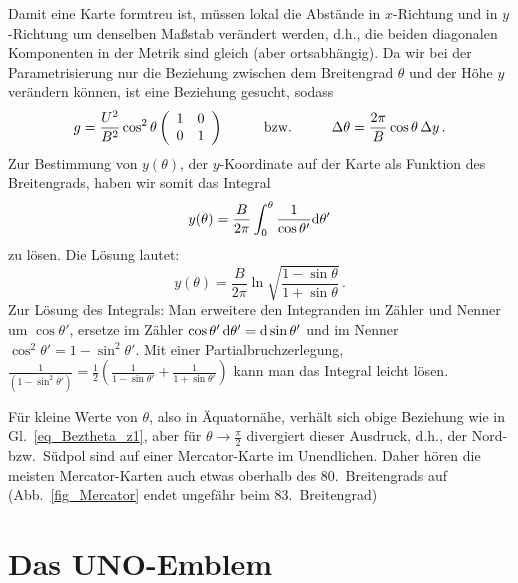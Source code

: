 Damit eine Karte formtreu ist, m\"ussen lokal die Abst\"ande in $x$-Richtung und in $y$-Richtung
um denselben Ma\ss stab ver\"andert werden, d.h., die beiden diagonalen Komponenten in der Metrik
sind gleich (aber ortsabh\"angig). Da wir bei der Parametrisierung nur die Beziehung zwischen dem
Breitengrad $\theta$ und der H\"ohe $y$ ver\"andern k\"onnen, ist eine Beziehung gesucht, sodass
\begin{equation}
     g = \frac{U^2}{B^2} \cos^2 \theta \left( \begin{array}{cc} 1 & 0 \\ 0 & 1 \end{array} \right)  
     \hspace{1cm} {\rm bzw.} \hspace{1cm}    \Delta \theta = \frac{2\pi}{B} \cos \theta\,  \Delta y \, .
\end{equation}
Zur Bestimmung von $y(\theta)$, der $y$-Koordinate auf der Karte als Funktion des Breitengrads,
haben wir somit das Integral
\begin{equation}
                     y(\theta) = \frac{B}{2\pi} \int_{0}^\theta \frac{1}{\cos \theta'} {\rm d}\theta'  
\end{equation}
zu l\"osen. Die L\"osung lautet:
\begin{equation}
                     y(\theta) = \frac{B}{2\pi}  \ln \sqrt{ \frac{1 - \sin \theta}{1+\sin \theta} }\, .
\end{equation}
Zur L\"osung des Integrals: Man erweitere den Integranden im Z\"ahler und Nenner um $\cos \theta'$, ersetze
im Z\"ahler $\cos \theta' \, {\rm d}\theta' = {\rm d} \sin \theta'$ und im Nenner $\cos^2\theta' = 1 - \sin^2 \theta'$.
Mit einer Partialbruchzerlegung, 
$\frac{1}{(1-\sin^2 \theta')} = \frac{1}{2} (\frac{1}{1-\sin \theta'} + \frac{1}{1+\sin \theta'})$
kann man das Integral leicht l\"osen. 

F\"ur kleine Werte von $\theta$, also in \"Aquatorn\"ahe, verh\"alt sich obige Beziehung wie in Gl.\ \ref{eq_Beztheta_z1},
aber f\"ur $\theta \rightarrow \frac{\pi}{2}$ divergiert dieser Ausdruck, d.h., der Nord- bzw.\ S\"udpol sind auf einer
Mercator-Karte im Unendlichen. Daher h\"oren die meisten Mercator-Karten auch etwas oberhalb des
$80$.\ Breitengrads auf (Abb.\ \ref{fig_Mercator} endet ungef\"ahr beim 83.\ Breitengrad) 

\section{Das UNO-Emblem}

